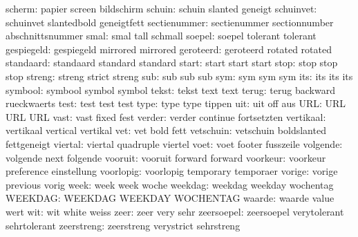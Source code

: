              scherm:  papier               screen              bildschirm %
             schuin:  schuin               slanted             geneigt
          schuinvet:  schuinvet            slantedbold         geneigtfett
       sectienummer:  sectienummer         sectionnumber       abschnittsnummer
               smal:  smal                 tall                schmall
             soepel:  soepel               tolerant            tolerant
         gespiegeld:  gespiegeld           mirrored            mirrored %
          geroteerd:  geroteerd            rotated             rotated  %
          standaard:  standaard            standard            standard
              start:  start                start               start
               stop:  stop                 stop                stop
             streng:  streng               strict              streng
                sub:  sub                  sub                 sub
                sym:  sym                  sym                 sym
                its:  its                  its                 its
            symbool:  symbool              symbol              symbol
              tekst:  tekst                text                text
              terug:  terug                backward            rueckwaerts
               test:  test                 test                test
               type:  type                 type                tippen
                uit:  uit                  off                 aus
                URL:  URL                  URL                 URL 
               vast:  vast                 fixed               fest
             verder:  verder               continue            fortsetzten
          vertikaal:  vertikaal            vertical            vertikal
                vet:  vet                  bold                fett
          vetschuin:  vetschuin            boldslanted         fettgeneigt
            viertal:  viertal              quadruple           viertel
               voet:  voet                 footer              fusszeile
           volgende:  volgende             next                folgende
            vooruit:  vooruit              forward             forward %
           voorkeur:  voorkeur             preference          einstellung
          voorlopig:  voorlopig            temporary           temporaer
             vorige:  vorige               previous            vorig
               week:  week                 week                woche
            weekdag:  weekdag              weekday             wochentag
            WEEKDAG:  WEEKDAG              WEEKDAY             WOCHENTAG
             waarde:  waarde               value               wert
                wit:  wit                  white               weiss
               zeer:  zeer                 very                sehr
         zeersoepel:  zeersoepel           verytolerant        sehrtolerant
         zeerstreng:  zeerstreng           verystrict          sehrstreng

